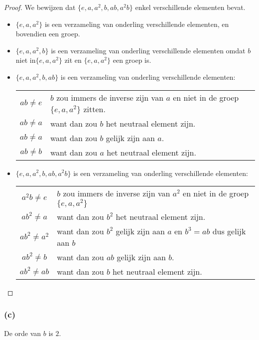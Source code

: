 \documentclass[main.tex]{subfiles}
\begin{document}
\begin{proof}
  We bewijzen dat $\{ e,a,a^{2},b,ab,a^{2}b \}$ enkel verschillende elementen bevat.
  \begin{itemize}
  \item $\{ e,a,a^{2} \}$ is een verzameling van onderling verschillende elementen, en bovendien een groep.
  \item $\{ e,a,a^{2},b \}$ is een verzameling van onderling verschillende elementen omdat $b$ niet in$\{ e,a,a^{2} \}$ zit en $\{ e,a,a^{2} \}$ een groep is.
  \item $\{ e,a,a^{2},b,ab \}$ is een verzameling van onderling verschillende elementen:\\
    \begin{tabular}[H]{cl}
      \centering
      $ab \neq e$ & $b$ zou immers de inverse zijn van $a$ en niet in de groep $\{ e,a,a^{2} \}$ zitten.\\
      $ab \neq a$ & want dan zou $b$ het neutraal element zijn.\\
      $ab \neq a$ & want dan zou $b$ gelijk zijn aan $a$.\\
      $ab \neq b$ & want dan zou $a$ het neutraal element zijn.\\
    \end{tabular}
  \item $\{ e,a,a^{2},b,ab,a^{2}b \}$ is een verzameling van onderling verschillende elementen:\\
    \begin{tabular}[H]{cl}
      $a^{2}b \neq e$ & $b$ zou immers de inverse zijn van $a^{2}$ en niet in de groep $\{ e,a,a^{2} \}$\\
      $ab^{2} \neq a$ & want dan zou $b^{2}$ het neutraal element zijn.\\
      $ab^{2} \neq a^{2}$ & want dan zou $b^{2}$ gelijk zijn aan $a$ en $b^{3}=ab$ dus gelijk aan $b$\\
      $ab^{2} \neq b$ & want dan zou $ab$ gelijk zijn aan $b$.\\
      $ab^{2} \neq ab$ & want dan zou $b$ het neutraal element zijn.\\
    \end{tabular}
  \end{itemize}
\end{proof}

\subsubsection*{(c)}
De orde van $b$ is $2$.
\end{document}
